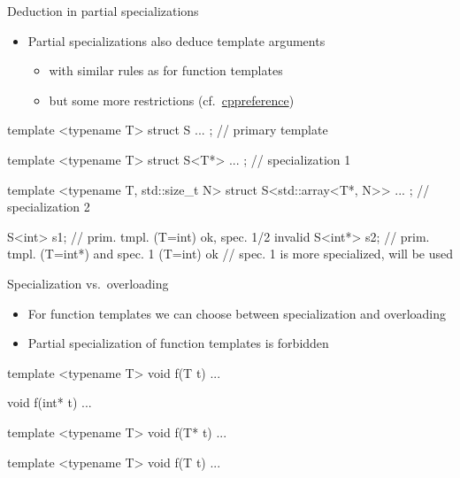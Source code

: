 \begin{advanced}
\begin{frame}[fragile]
  \begin{block}{Deduction in partial specializations}
    \begin{itemize}
      \item Partial specializations also deduce template arguments
      \begin{itemize}
        \item with similar rules as for function templates
        \item but some more restrictions (cf.\ \href{https://en.cppreference.com/w/cpp/language/partial_specialization}{cppreference})
      \end{itemize}
    \end{itemize}
  \end{block}
  \small
  \begin{cppcode*}{}
    template <typename T>
    struct S { ... }; // primary template

    template <typename T>
    struct S<T*> { ... }; // specialization 1

    template <typename T, std::size_t N>
    struct S<std::array<T*, N>> { ... }; // specialization 2

    S<int>  s1; // prim. tmpl. (T=int) ok, spec. 1/2 invalid
    S<int*> s2; // prim. tmpl. (T=int*) and spec. 1 (T=int) ok
                // spec. 1 is more specialized, will be used
  \end{cppcode*}
\end{frame}

\begin{frame}[fragile]
  \begin{block}{Specialization vs.\ overloading}
    \begin{itemize}
      \item For function templates we can choose between specialization and overloading
      \item Partial specialization of function templates is forbidden
    \end{itemize}
  \end{block}
  \small
  \begin{multicols}{2}
    \begin{cppcode*}{}
      template <typename T>
      void f(T t) { ... }


      void f(int* t) { ... }


      template <typename T>
      void f(T* t) { ... }
    \end{cppcode*}
    \columnbreak
    \begin{cppcode*}{}
      template <typename T>
      void f(T t) { ... }


\end{cppcode*}
\end{multicols}
\end{frame}
\end{advanced}
